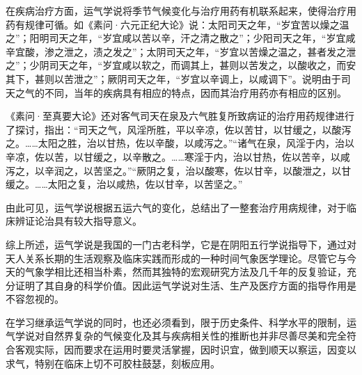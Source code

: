 \documentclass[12pt]{ctexbook}
\begin{document}
在疾病治疗方面，运气学说将季节气候变化与治疗用药有机联系起来，使得治疗用药有规律可循。如《素问·六元正纪大论》说：太阳司天之年，“岁宜苦以燥之温之”；阳明司天之年，“岁宜咸以苦以辛，汗之清之散之”；少阳司天之年，“岁宜咸辛宜酸，渗之泄之，渍之发之”；太阴司天之年，“岁宜以苦燥之温之，甚者发之泄之”；少阴司天之年，“岁宜咸以软之，而调其上，甚则以苦发之，以酸收之，而安其下，甚则以苦泄之”；厥阴司天之年，“岁宜以辛调上，以咸调下”。说明由于司天之气的不同，当年的疾病具有相应的特点，因而其治疗用药亦有相应的区别。

《素问·至真要大论》还对客气司天在泉及六气胜复所致病证的治疗用药规律进行了探讨，指出：“司天之气，风淫所胜，平以辛凉，佐以苦甘，以甘缓之，以酸泻之。……太阳之胜，治以甘热，佐以辛酸，以咸泻之。”“诸气在泉，风淫于内，治以辛凉，佐以苦，以甘缓之，以辛散之。……寒淫于内，治以甘热，佐以苦辛，以咸泻之，以辛润之，以苦坚之。”“厥阴之复，治以酸寒，佐以甘辛，以酸泄之，以甘缓之。……太阳之复，治以咸热，佐以甘辛，以苦坚之。”

由此可见，运气学说根据五运六气的变化，总结出了一整套治疗用病规律，对于临床辨证论治具有较大指导意义。

综上所述，运气学说是我国的一门古老科学，它是在阴阳五行学说指导下，通过对天人关系长期的生活观察及临床实践而形成的一种时间气象医学理论。尽管它与今天的气象学相比还相当朴素，然而其独特的宏观研究方法及几千年的反复验证，充分证明了其自身的科学价值。因此运气学说对生活、生产及医疗方面的指导作用是不容忽视的。

在学习继承运气学说的同时，也还必须看到，限于历史条件、科学水平的限制，运气学说对自然界复杂的气候变化及其与疾病相关性的推断也并非尽善尽美和完全符合客观实际，因而要求在运用时要灵活掌握，因时识宜，做到顺天以察运，因变以求气，特别在临床上切不可胶柱鼓瑟，刻板应用。

\ifx \allfiles \undefined
\end{document}
